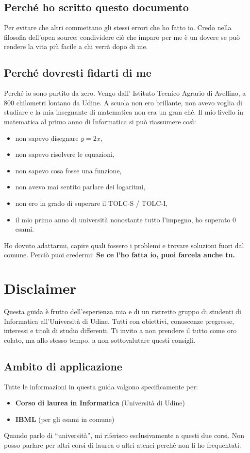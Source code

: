 \documentclass[18pt]{extarticle}
\begin{document}
\subsection{Perché ho scritto questo documento}
Per evitare che altri commettano gli stessi errori che ho fatto io.  
Credo nella filosofia dell’open source: condividere ciò che imparo per me è un dovere se può rendere la vita più facile a chi verrà dopo di me.

\subsection{Perché dovresti fidarti di me}
Perché io sono partito da zero.  
Vengo dall' Istituto Tecnico Agrario di Avellino, a 800 chilometri lontano da Udine. 
A scuola non ero brillante, non avevo voglia di studiare e la mia insegnante di matematica non era un gran ché.  
Il mio livello in matematica al primo anno di Informatica si può riassumere così:
\begin{itemize}
\item non sapevo disegnare $y = 2x$,
\item non sapevo risolvere le equazioni,
\item non sapevo cosa fosse una funzione,
\item non avevo mai sentito parlare dei logaritmi,
\item non ero in grado di superare il TOLC-S / TOLC-I, 
\item il mio primo anno di università nonostante tutto l'impegno, ho superato 0 esami. 
\end{itemize}%
Ho dovuto adattarmi, capire quali fossero i problemi e trovare soluzioni fuori dal comune. 
Perciò puoi credermi: \textbf{Se ce l'ho fatta io, puoi farcela anche tu.}

\clearpage
\section{Disclaimer}
Questa guida è frutto dell'esperienza mia e di un ristretto gruppo di studenti di Informatica all'Università di Udine. Tutti con obiettivi, conoscenze pregresse, interessi e titoli di studio differenti.
Ti invito a non prendere il tutto come oro colato, ma allo stesso tempo, a non sottovalutare questi consigli.


\subsection{Ambito di applicazione}
Tutte le informazioni in questa guida valgono specificamente per:
\begin{itemize}
    \item \textbf{Corso di laurea in Informatica} (Università di Udine)
    \item \textbf{IBML} (per gli esami in comune)
\end{itemize}
Quando parlo di ``università'', mi riferisco esclusivamente a questi due corsi. Non posso parlare per altri corsi di laurea o altri atenei perché non li ho frequentati.
\end{document}
